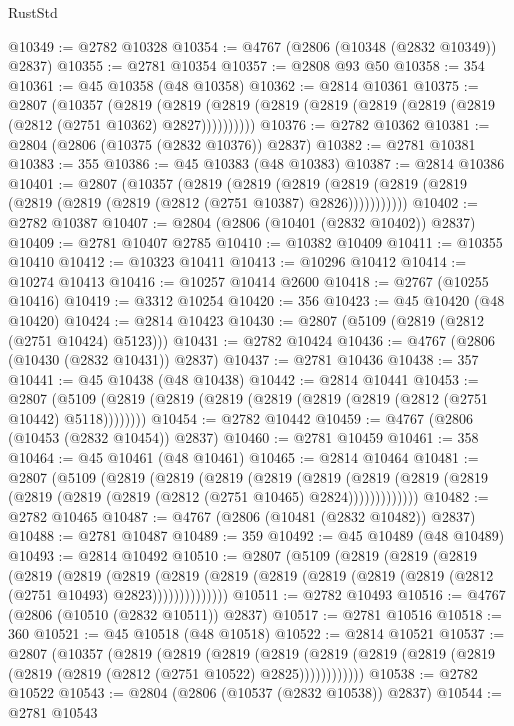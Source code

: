 \begin{lexlean}{RustStd}
\begin{coremodule}
@10349 := @2782 @10328
@10354 := @4767 (@2806 (@10348 (@2832 @10349)) @2837)
@10355 := @2781 @10354
@10357 := @2808 @93 @50
@10358 := 354
@10361 := @45 @10358 (@48 @10358)
@10362 := @2814 @10361
@10375 := @2807
    (@10357
      (@2819 (@2819 (@2819 (@2819 (@2819 (@2819 (@2819 (@2819 (@2812 (@2751 @10362) @2827))))))))))
@10376 := @2782 @10362
@10381 := @2804 (@2806 (@10375 (@2832 @10376)) @2837)
@10382 := @2781 @10381
@10383 := 355
@10386 := @45 @10383 (@48 @10383)
@10387 := @2814 @10386
@10401 := @2807
    (@10357
      (@2819
        (@2819
          (@2819 (@2819 (@2819 (@2819 (@2819 (@2819 (@2819 (@2812 (@2751 @10387) @2826)))))))))))
@10402 := @2782 @10387
@10407 := @2804 (@2806 (@10401 (@2832 @10402)) @2837)
@10409 := @2781 @10407 @2785
@10410 := @10382 @10409
@10411 := @10355 @10410
@10412 := @10323 @10411
@10413 := @10296 @10412
@10414 := @10274 @10413
@10416 := @10257 @10414 @2600
@10418 := @2767 (@10255 @10416)
@10419 := @3312 @10254
@10420 := 356
@10423 := @45 @10420 (@48 @10420)
@10424 := @2814 @10423
@10430 := @2807 (@5109 (@2819 (@2812 (@2751 @10424) @5123)))
@10431 := @2782 @10424
@10436 := @4767 (@2806 (@10430 (@2832 @10431)) @2837)
@10437 := @2781 @10436
@10438 := 357
@10441 := @45 @10438 (@48 @10438)
@10442 := @2814 @10441
@10453 := @2807 (@5109 (@2819 (@2819 (@2819 (@2819 (@2819 (@2819 (@2812 (@2751 @10442) @5118))))))))
@10454 := @2782 @10442
@10459 := @4767 (@2806 (@10453 (@2832 @10454)) @2837)
@10460 := @2781 @10459
@10461 := 358
@10464 := @45 @10461 (@48 @10461)
@10465 := @2814 @10464
@10481 := @2807
    (@5109
      (@2819
        (@2819
          (@2819
            (@2819
              (@2819
                (@2819 (@2819 (@2819 (@2819 (@2819 (@2819 (@2812 (@2751 @10465) @2824)))))))))))))
@10482 := @2782 @10465
@10487 := @4767 (@2806 (@10481 (@2832 @10482)) @2837)
@10488 := @2781 @10487
@10489 := 359
@10492 := @45 @10489 (@48 @10489)
@10493 := @2814 @10492
@10510 := @2807
    (@5109
      (@2819
        (@2819
          (@2819
            (@2819
              (@2819
                (@2819
                  (@2819
                    (@2819 (@2819 (@2819 (@2819 (@2819 (@2812 (@2751 @10493) @2823))))))))))))))
@10511 := @2782 @10493
@10516 := @4767 (@2806 (@10510 (@2832 @10511)) @2837)
@10517 := @2781 @10516
@10518 := 360
@10521 := @45 @10518 (@48 @10518)
@10522 := @2814 @10521
@10537 := @2807
    (@10357
      (@2819
        (@2819
          (@2819
            (@2819 (@2819 (@2819 (@2819 (@2819 (@2819 (@2819 (@2812 (@2751 @10522) @2825))))))))))))
@10538 := @2782 @10522
@10543 := @2804 (@2806 (@10537 (@2832 @10538)) @2837)
@10544 := @2781 @10543

\end{coremodule}
\end{lexlean}
